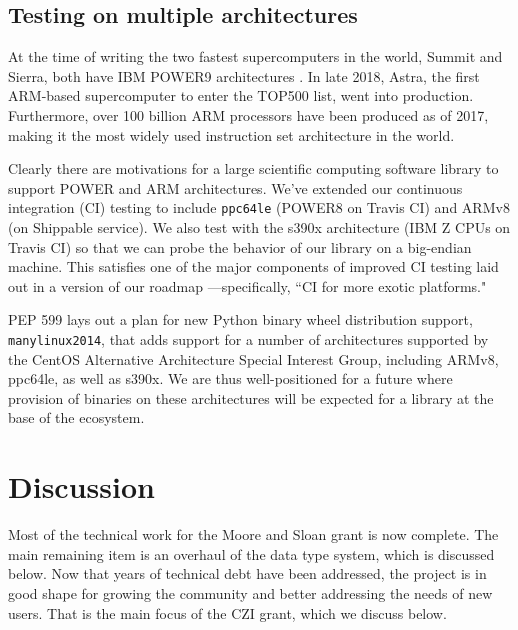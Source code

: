 \documentclass[fleqn,10pt]{wlscirep}
\begin{document}
\subsection*{Testing on multiple architectures}


At the time of writing the two fastest supercomputers in the
world, Summit and Sierra, both have IBM POWER9 architectures
\cite{top500nov2019}. In late 2018, Astra, the first ARM-based
supercomputer to enter the TOP500 list, went into production\cite{
astra-wiki}. Furthermore, over 100 billion ARM processors have been
produced as of 2017\cite{arm-architecture}, making it the most 
widely used instruction set architecture in the world.

Clearly there are motivations for a large scientific computing
software library to support POWER and ARM architectures. We've extended
our continuous integration (CI) testing to include \texttt{ppc64le}
(POWER8 on Travis CI) and ARMv8 (on Shippable service). We also test
with the s390x architecture (IBM Z CPUs on Travis CI) so that we
can probe the behavior of our library on a big-endian machine.
This satisfies one of the major components of
improved CI testing laid out in a version of our roadmap
\cite{numpy-roadmap}---specifically, ``CI for more exotic
platforms."

PEP 599\cite{PEP599} lays out a plan for new Python binary wheel
distribution support, \texttt{manylinux2014}, that adds
support for a number of architectures supported by the CentOS
Alternative Architecture Special Interest Group, including
ARMv8, ppc64le, as well as s390x. We are thus well-positioned
for a future where provision of binaries on these architectures
will be expected for a library at the base of the ecosystem.


\section*{Discussion}


Most of the technical work for the Moore and Sloan grant is now complete.
The main remaining item is an overhaul of the data type system, which is discussed
below.  Now that years of technical debt have been addressed, the project
is in good shape for growing the community and better addressing the needs
of new users.  That is the main focus of the CZI grant, which we discuss
below.
\end{document}

